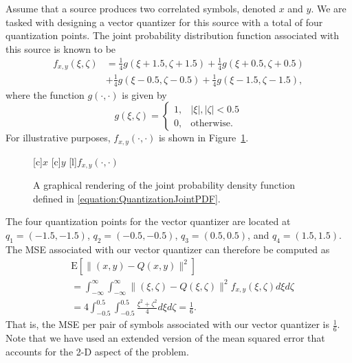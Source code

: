 \begin{example} \label{example:VectorQuantization}
Assume that a source produces two correlated symbols, denoted $x$ and $y$.
We are tasked with designing a vector quantizer for this source with a total of four quantization points.
The joint probability distribution function associated with this source is known to be
\begin{equation} \label{equation:QuantizationJointPDF}
\begin{split}
f_{x,y} (\xi, \zeta) &= \frac{1}{4} g ( \xi + 1.5, \zeta + 1.5 )
+ \frac{1}{4} g ( \xi + 0.5, \zeta + 0.5 ) \\
&+ \frac{1}{4} g ( \xi - 0.5, \zeta - 0.5 )
+ \frac{1}{4} g ( \xi - 1.5, \zeta - 1.5 ) ,
\end{split}
\end{equation}
where the function $g(\cdot, \cdot)$ is given by
\begin{equation*}
g(\xi, \zeta) = \begin{cases} 1, &  |\xi|, |\zeta| < 0.5 \\
0, & \text{otherwise}. \end{cases}
\end{equation*}
For illustrative purposes, $f_{x,y} (\cdot, \cdot)$ is shown in Figure~\ref{figure:VectorQuantization}.
\begin{figure}[htbp]
\begin{center}
\begin{psfrags}
[c]{$x$}
[c]{$y$}
[l]{$f_{x,y}(\cdot, \cdot)$}
\end{psfrags}
\caption{A graphical rendering of the joint probability density function defined in \eqref{equation:QuantizationJointPDF}.}
\label{figure:VectorQuantization}
\end{center}
\end{figure}
The four quantization points for the vector quantizer are located at $q_1 = (-1.5, -1.5)$, $q_2 = (-0.5, -0.5)$, $q_3 = (0.5, 0.5)$, and $q_4 = (1.5, 1.5)$.
The MSE associated with our vector quantizer can therefore be computed as
\begin{equation*}
\begin{split}
&\mathrm{E} \left[ \| (x,y) - Q(x,y) \|^2 \right] \\
&= \int_{-\infty}^{\infty} \int_{-\infty}^{\infty}
\| (\xi, \zeta) - Q(\xi, \zeta) \|^2 f_{x,y}(\xi,\zeta) d\xi d\zeta \\
&= 4 \int_{-0.5}^{0.5} \int_{-0.5}^{0.5} \frac{\xi^2 + \zeta^2}{4} d\xi d\zeta
= \frac{1}{6} .
\end{split}
\end{equation*}
That is, the MSE per pair of symbols associated with our vector quantizer is $\frac{1}{6}$.
Note that we have used an extended version of the mean squared error that accounts for the 2-D aspect of the problem.


\end{example}
